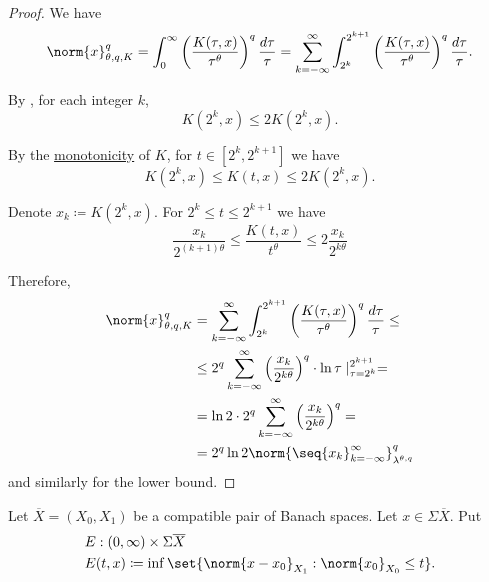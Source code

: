 \begin{proof}
  We have
  \begin{equation*}
    \norm{x}_{\theta,q,K}^q
    =
    \int_0^\infty \left( \frac {K(\tau, x)} {\tau^\theta} \right)^q \frac {d\tau} \tau
    =
    \sum_{k=-\infty}^\infty \int_{2^k}^{2^{k+1}} \left( \frac {K(\tau, x)} {\tau^\theta} \right)^q \frac {d\tau} \tau.
  \end{equation*}

  By , for each integer \( k \),
  \begin{equation*}
    K(2^k, x) \leq 2 K(2^k, x).
  \end{equation*}

  By the \hyperref[def:k_functional_properties/basic]{monotonicity} of \( K \), for \( t \in [2^k, 2^{k+1}] \) we have
  \begin{equation*}
    K(2^k, x) \leq K(t, x) \leq 2 K(2^k, x).
  \end{equation*}

  Denote \( x_k \coloneqq K(2^k, x) \). For \( 2^k \leq t \leq 2^{k+1} \) we have
  \begin{equation*}
    \frac{x_k}{2^{(k+1)\theta}} \leq \frac{K(t, x)}{t^\theta} \leq 2 \frac{x_k}{2^{k\theta}}
  \end{equation*}

  Therefore,
  \begin{align*}
    \norm{x}_{\theta,q,K}^q
    &=
    \sum_{k=-\infty}^\infty \int_{2^k}^{2^{k+1}} \left( \frac {K(\tau, x)} {\tau^\theta} \right)^q \frac {d\tau} \tau
    \leq \\ &\leq
    2^q \sum_{k=-\infty}^\infty \left(\frac{x_k}{2^{k\theta}} \right)^q \cdot \ln \tau \mid_{\tau=2^k}^{2^{k+1}}
    = \\ &=
    \ln 2 \cdot 2^q \sum_{k=-\infty}^\infty \left(\frac{x_k}{2^{k\theta}} \right)^q
    = \\ &=
    2^q \ln 2 \norm{\seq{ x_k }_{k=-\infty}^\infty}_{\lambda^{\theta,q}}^q
  \end{align*}
  and similarly for the lower bound.
\end{proof}

\begin{definition}\label{def:e_functional}
  Let \( \overline{X} = (X_0, X_1) \) be a compatible pair of Banach spaces. Let \( x \in \Sigma \overline{X} \). Put
  \begin{equation}\label{eq:def:e_functional}
    \begin{aligned}
      &E: (0, \infty) \times {\Sigma \overline{X}} \\
      &E(t, x) \coloneqq \inf \set{ \norm{x - x_0}_{X_1} : \norm{x_0}_{X_0} \leq t }.
    \end{aligned}
  \end{equation}
\end{definition}

